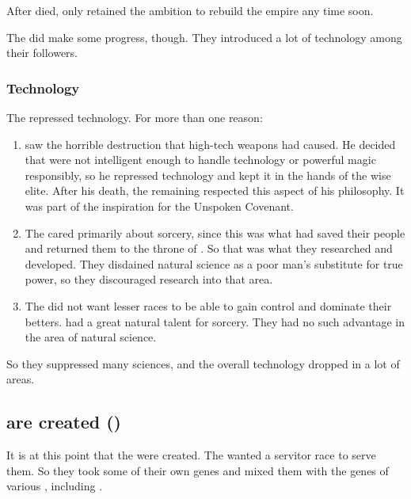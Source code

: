 After \Nexagglachel died, only \Secherdamon retained the ambition to rebuild the \ophidian empire any time soon. 

The \dragons did make some progress, though. 
They introduced a lot of technology among their followers.





\subsubsection{Technology}
The \dragons repressed technology. 
For more than one reason:

\begin{enumerate}
  \item 
    \Nexagglachel saw the horrible destruction that high-tech weapons had caused.
    He decided that \humanoids were not intelligent enough to handle technology or powerful magic responsibly, so he repressed technology and kept it in the hands of the wise elite. 
    After his death, the remaining \dragons respected this aspect of his philosophy.
    It was part of the inspiration for the Unspoken Covenant. 

  \item 
    The \dragons cared primarily about sorcery, since this was what had saved their people and returned them to the throne of \Miith. 
    So that was what they researched and developed. 
    They disdained natural science as a poor man's substitute for true power, so they discouraged research into that area. 

  \item 
    The \dragons did not want lesser races to be able to gain control and dominate their betters. 
    \Dragons had a great natural talent for sorcery. 
    They had no such advantage in the area of natural science. 
\end{enumerate}

So they suppressed many sciences, and the overall technology dropped in a lot of areas. 









\subsection[Scathae are created (\yds{Scathae created})]{\Scathae are created ()}
It is at this point that the \scathae were created. 
The \dragons{} wanted a servitor race to serve them. 
So they took some of their own \ophidian genes and mixed them with the genes of various \saurians, including . 

